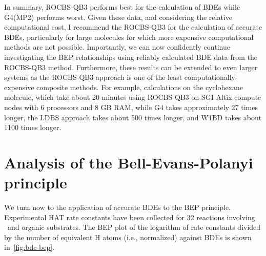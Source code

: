 In summary, ROCBS-QB3 performs best for the calculation of  BDEs while
G4(MP2) performs worst. Given these data, and considering the relative
computational cost, I recommend the ROCBS-QB3 for the calculation of accurate
BDEs, particularly for large molecules for which more expensive computational
methods are not possible. Importantly, we can now confidently continue
investigating the BEP relationships using reliably calculated BDE data from the
ROCBS-QB3 method. Furthermore, these results can be extended to even larger
systems as the ROCBS-QB3 approach is one of the least computationally-expensive
composite methods. For example, calculations on the cyclohexane molecule, which
take about 20 minutes using ROCBS-QB3 on SGI Altix compute nodes with 6
processors and 8 GB RAM, while G4 takes approximately 27 times longer, the LDBS
approach takes about 500 times longer, and W1BD takes about 1100 times longer.

\section{Analysis of the Bell-Evans-Polanyi principle}

We turn now to the application of accurate BDEs to the BEP principle.
Experimental HAT rate constants have been collected for 32 reactions involving
\cumo\ and organic substrates. The BEP plot of the logarithm of rate constants
divided by the number of equivalent H atoms (i.e., normalized) against BDEs is
shown in~\ref{fig:bde-bep}.

